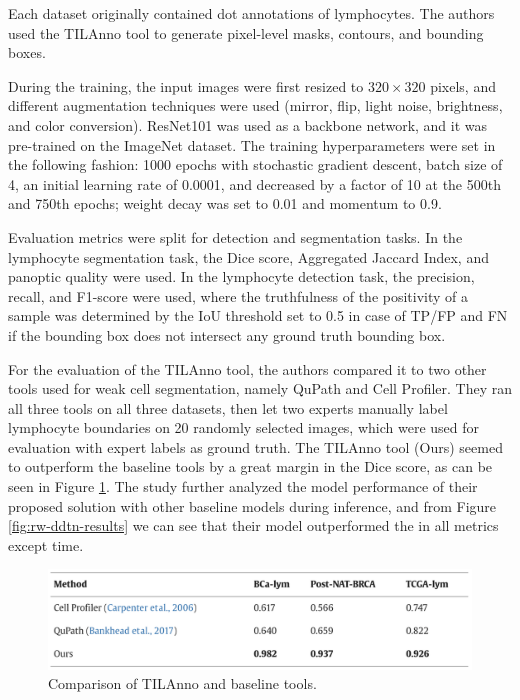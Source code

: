 Each dataset originally contained dot annotations of lymphocytes. The authors used the TILAnno tool to generate pixel-level masks, contours, and bounding boxes.

During the training, the input images were first resized to $320\!\times\!320$ pixels, and different augmentation techniques were used (mirror, flip, light noise, brightness, and color conversion). ResNet101 was used as a backbone network, and it was pre-trained on the ImageNet dataset. The training hyperparameters were set in the following fashion: 1000 epochs with stochastic gradient descent, batch size of 4, an initial learning rate of 0.0001, and decreased by a factor of 10 at the 500th and 750th epochs; weight decay was set to 0.01 and momentum to 0.9.

Evaluation metrics were split for detection and segmentation tasks. In the lymphocyte segmentation task, the Dice score, Aggregated Jaccard Index, and panoptic quality were used. In the lymphocyte detection task, the precision, recall, and F1-score were used, where the truthfulness of the positivity of a sample was determined by the IoU threshold set to 0.5 in case of TP/FP and FN if the bounding box does not intersect any ground truth bounding box.

For the evaluation of the TILAnno tool, the authors compared it to two other tools used for weak cell segmentation, namely QuPath and Cell Profiler. They ran all three tools on all three datasets, then let two experts manually label lymphocyte boundaries on 20 randomly selected images, which were used for evaluation with expert labels as ground truth. The TILAnno tool (Ours) seemed to outperform the baseline tools by a great margin in the Dice score, as can be seen in Figure \ref{fig:rw-ddtn-tilanno}. The study further analyzed the model performance of their proposed solution with other baseline models during inference, and from Figure \ref{fig:rw-ddtn-results} we can see that their model outperformed the in all metrics except time.

\begin{figure}[H]
    \begin{centering}
    \includegraphics[width=14cm]{assets/images/rw-ddtn-tilanno-eval.png}
    \par\end{centering}
    \caption{Comparison of TILAnno and baseline tools.}
    \label{fig:rw-ddtn-tilanno}
\end{figure}

